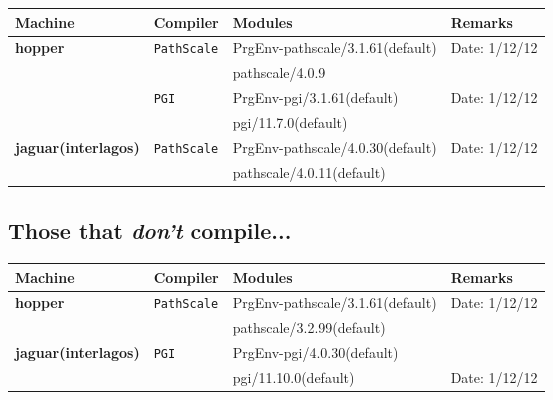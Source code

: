 \begin{table*}[!h]
\begin{tabular}{|l|l|l|l|} \hline
Machine & Compiler & Modules & Remarks \\
\hline
{\bf hopper} & {\tt PathScale} & PrgEnv-pathscale/3.1.61(default) & Date: 1/12/12\\
& & pathscale/4.0.9 & \\
\cline{2-4}
& {\tt PGI} & PrgEnv-pgi/3.1.61(default) & Date: 1/12/12\\
& & pgi/11.7.0(default) & \\
\hline
{\bf jaguar(interlagos)} & {\tt PathScale} & PrgEnv-pathscale/4.0.30(default) & Date: 1/12/12\\
& & pathscale/4.0.11(default) & \\
\hline
\end{tabular}
\label{Table:Those-that-compile}
\end{table*}

\subsection{Those that {\em don't} compile...}
\begin{table*}[!h]
\begin{tabular}{|l|l|l|l|} \hline
Machine & Compiler & Modules & Remarks \\
\hline
{\bf hopper} & {\tt PathScale} & PrgEnv-pathscale/3.1.61(default) & Date: 1/12/12\\
& & pathscale/3.2.99(default) & \\
\hline
{\bf jaguar(interlagos)} & {\tt PGI} & PrgEnv-pgi/4.0.30(default) & \\
& & pgi/11.10.0(default) & Date: 1/12/12\\
\hline
\end{tabular}
\label{Table:Those-that-dont-compile}
\end{table*}
